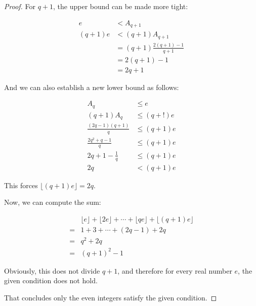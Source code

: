 \begin{proof}
For $ q + 1 $, the upper bound can be made more tight:

\begin{align*}
       e &< A_{q+1}                     \\
  (q+1)e &< (q+1)A_{q+1}                \\
         &= (q+1)\frac{2(q+1) - 1}{q+1} \\
         &= 2(q+1) - 1                  \\
         &= 2q + 1
\end{align*}

And we can also establish a new lower bound as follows:

\begin{align*}
                      A_{q} &\le e        \\
                 (q+1)A_{q} &\le (q+!)e   \\
  \frac{(2q - 1)(q + 1)}{q} &\le (q + 1)e \\
     \frac{2q^2 + q - 1}{q} &\le (q + 1)e \\
       2q + 1 - \frac{1}{q} &\le (q + 1)e \\
                         2q &<   (q + 1)e
\end{align*}

This forces $ \lfloor (q+1)e \rfloor = 2q $.

Now, we can compute the sum:

\begin{align*}
    & \lfloor e \rfloor + \lfloor 2 e \rfloor + \cdots + \lfloor q e \rfloor + \lfloor (q+1) e \rfloor \\
   =& 1 + 3 + \cdots + (2q - 1) + 2q                                                                   \\
   =& q^2 + 2q                                                                                         \\
   =& (q+1)^2 - 1
 \end{align*}

 Obviously, this does not divide $ q + 1 $, and therefore for every real number $ e $, the given condition does not hold.

That concludes only the even integers satisfy the given condition.

\end{proof}
